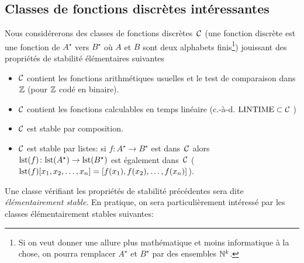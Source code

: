 \subsection{Classes de fonctions discrètes intéressantes}\label{fsubsec12} 
Nous considérerons des classes de fonctions discrètes~${{\cal C}}$   (une fonction 
discrète est une fonction de $A^{\star}$
vers  $B^{\star}$  où  $A$  et  $B$  sont deux alphabets finis{\footnote{Si 
on veut donner une allure plus mathématique et moins informatique à la 
chose, on pourra remplacer  $A^{\star}$  et  $B^{\star}$  par des ensembles  
$\mathbb {N}^k$.}}) jouissant des propriétés de stabilité élémentaires 
suivantes
\begin{itemize}
\item ${{\cal C}}$ contient les fonctions arithmétiques usuelles et le test de 
comparaison dans  $\mathbb {Z}$   (pour  $\mathbb {Z}$  codé en binaire).
\item ${{\cal C}}$ contient les fonctions calculables en temps linéaire  (c.-à-d. 
${\rm LINTIME}  \subset  {{\cal C}}$  )
\item ${{\cal C}}$ est stable par composition.
\item ${{\cal C}}$ est stable par listes:  si  $f\colon A^{\star} \rightarrow
B^{\star}$ est dans~${{\cal C}}$ alors ${\rm lst}(f) \colon  {\rm lst}(A^{\star})
\rightarrow {\rm lst}(B^{\star})$ est également dans~${{\cal C}}$ 
(${\rm lst}(f)[x_1, x_2,\ldots, x_n] = [f(x_1), f(x_2),\ldots, f(x_n)]$).
\end{itemize}
Une classe vérifiant les propriétés de stabilité précédentes sera 
dite {\em élémentairement stable}.
En pratique, on sera particulièrement intéressé par les classes 
élémentairement stables suivantes:
